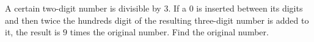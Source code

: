A certain two-digit number is divisible by $3$. If a $0$ is inserted between its digits and then twice the hundreds digit of the resulting three-digit number is added to it, the result is $9$ times the original number. Find the original number.
